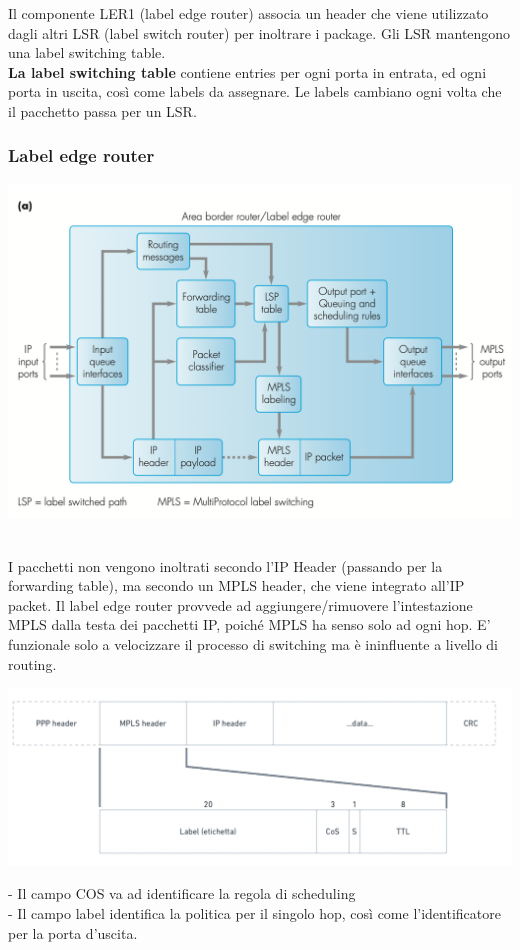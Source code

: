 \documentclass[11pt, oneside]{article}   	%
\begin{document}
Il componente LER1 (label edge router) associa un header che viene utilizzato dagli altri LSR (label switch router) per inoltrare i package. Gli LSR mantengono una label switching table. \\
\textbf{La label switching table} contiene entries per ogni porta in entrata, ed ogni porta in uscita, così come labels da assegnare. Le labels cambiano ogni volta che il pacchetto passa per un LSR.
\subsubsection*{Label edge router}
\begin{center}
\includegraphics[scale=0.5]{et1}\
\end{center}
I pacchetti non vengono inoltrati secondo l'IP Header (passando per la forwarding table), ma secondo un MPLS header, che viene integrato all'IP packet. Il label edge router provvede ad aggiungere/rimuovere l'intestazione MPLS dalla testa dei pacchetti IP, poiché MPLS ha senso solo ad ogni hop. E' funzionale solo a velocizzare il processo di switching ma è ininfluente a livello di routing.
\begin{center}
\includegraphics[scale=0.5]{newlabel}\\ 
\end{center}
- Il campo COS va ad identificare la regola di scheduling\\
- Il campo label identifica la politica per il singolo hop, così come l'identificatore per la porta d'uscita.\\
\end{document}
